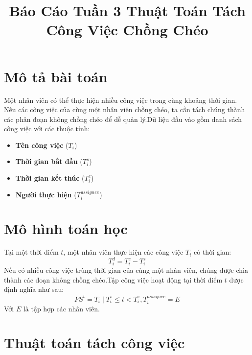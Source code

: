 \documentclass{article}
\title{Báo Cáo Tuần 3 Thuật Toán Tách Công Việc Chồng Chéo}
\begin{document}
\maketitle

\section{Mô tả bài toán}
Một nhân viên có thể thực hiện nhiều công việc trong cùng khoảng thời gian. Nếu các công việc của cùng một nhân viên chồng chéo, ta cần tách chúng thành các phân đoạn không chồng chéo để dễ quản lý.Dữ liệu đầu vào gồm danh sách công việc với các thuộc tính:
\begin{itemize}
\item \textbf{Tên công việc} ($T_i$)
\item \textbf{Thời gian bắt đầu} ($T_i^{s}$)
\item \textbf{Thời gian kết thúc} ($T_i^{e}$)
\item \textbf{Người thực hiện} ($T_i^{assignee}$)
\end{itemize}

\section{Mô hình toán học}
Tại một thời điểm $t$, một nhân viên thực hiện các công việc $T_i$ có thời gian:
\begin{equation}
T_i^{d} = T_i^{e} - T_i^{s}
\end{equation}
Nếu có nhiều công việc trùng thời gian của cùng một nhân viên, chúng được chia thành các đoạn không chồng chéo.Tập công việc hoạt động tại thời điểm $t$ được định nghĩa như sau:
\begin{equation}
PS^t = { T_i \mid T_i^{s} \leq t < T_i^{e}, T_i^{assignee} = E }
\end{equation}
Với $E$ là tập hợp các nhân viên.

\section{Thuật toán tách công việc}
\end{document}
